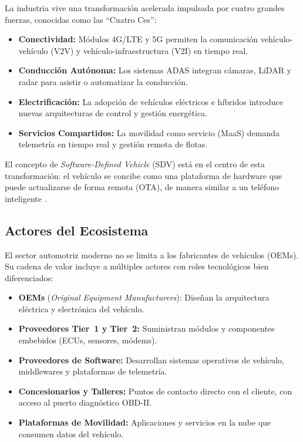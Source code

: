 \documentclass[letterpaper,11pt]{article}
\begin{document}
La industria vive una transformación acelerada impulsada por cuatro grandes fuerzas, conocidas como las ``Cuatro Ces'':

\begin{itemize}[leftmargin=1.5cm]
    \item \textbf{Conectividad:} Módulos 4G/LTE y 5G permiten la comunicación vehículo-vehículo (V2V) y vehículo-infraestructura (V2I) en tiempo real.
    \item \textbf{Conducción Autónoma:} Los sistemas ADAS integran cámaras, LiDAR y radar para asistir o automatizar la conducción.
    \item \textbf{Electrificación:} La adopción de vehículos eléctricos e híbridos introduce nuevas arquitecturas de control y gestión energética.
    \item \textbf{Servicios Compartidos:} La movilidad como servicio (MaaS) demanda telemetría en tiempo real y gestión remota de flotas.
\end{itemize}

El concepto de \textit{Software-Defined Vehicle} (SDV) está en el centro de esta transformación: el vehículo se concibe como una plataforma de hardware que puede actualizarse de forma remota (OTA), de manera similar a un teléfono inteligente \autocite{trendmicro-car-hacking}.

\subsection{Actores del Ecosistema}

El sector automotriz moderno no se limita a los fabricantes de vehículos (OEMs). Su cadena de valor incluye a múltiples actores con roles tecnológicos bien diferenciados:

\begin{itemize}[leftmargin=1.5cm]
    \item \textbf{OEMs} (\textit{Original Equipment Manufacturers}): Diseñan la arquitectura eléctrica y electrónica del vehículo.
    \item \textbf{Proveedores Tier~1 y Tier~2:} Suministran módulos y componentes embebidos (ECUs, sensores, módems).
    \item \textbf{Proveedores de Software:} Desarrollan sistemas operativos de vehículo, middlewares y plataformas de telemetría.
    \item \textbf{Concesionarios y Talleres:} Puntos de contacto directo con el cliente, con acceso al puerto diagnóstico OBD-II.
    \item \textbf{Plataformas de Movilidad:} Aplicaciones y servicios en la nube que consumen datos del vehículo.
\end{itemize}
\end{document}
